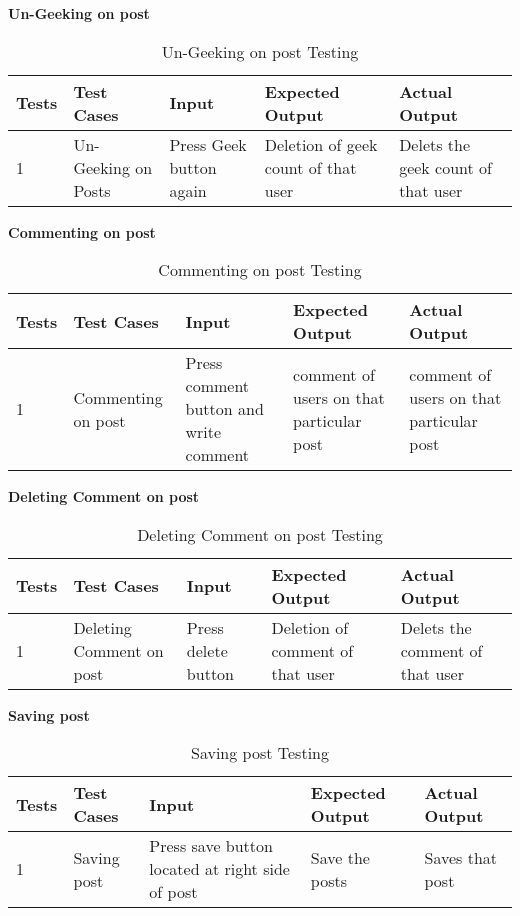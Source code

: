 \newpage
\textbf{Un-Geeking on post}\\
\begin{table}[H]
    \caption{Un-Geeking on post Testing}
        \label{}
    \begin{tabular}{|p{0.3in}|p{1.2in}|p{1.2in}|p{1.2in}|p{1in}|}
        \hline
        Tests & Test Cases & Input &Expected Output & Actual Output \\
        \hline
            1 & Un-Geeking on Posts & Press Geek button again & Deletion of geek count of that user &Delets the geek count of that user \\
            \hline
\end{tabular}
\end{table}

\textbf{Commenting on post}\\
\begin{table}[H]
    \caption{Commenting on post Testing}
        \label{}
    \begin{tabular}{|p{0.3in}|p{1.2in}|p{1.2in}|p{1.2in}|p{1in}|}
        \hline
        Tests & Test Cases & Input &Expected Output & Actual Output \\
        \hline
            1 &Commenting on post & Press comment button and write comment & comment of users on that particular post & comment of users on that particular post \\
            \hline
\end{tabular}
\end{table}

\textbf{Deleting Comment on post}\\
\begin{table}[H]
    \caption{Deleting Comment on post Testing}
        \label{}
    \begin{tabular}{|p{0.3in}|p{1.2in}|p{1.2in}|p{1.2in}|p{1in}|}
        \hline
        Tests & Test Cases & Input &Expected Output & Actual Output \\
        \hline
            1 &Deleting Comment on post & Press delete button & Deletion of comment of that user& Delets the comment of that user \\
            \hline
\end{tabular}
\end{table}

\newpage
\textbf{Saving post}\\
\begin{table}[H]
    \caption{Saving post Testing}
        \label{}
    \begin{tabular}{|p{0.3in}|p{1.2in}|p{1.2in}|p{1.2in}|p{1in}|}
        \hline
        Tests & Test Cases & Input &Expected Output & Actual Output \\
        \hline
            1 &Saving post & Press save button located at right side of post & Save the posts & Saves that post \\
            \hline
\end{tabular}
\end{table}

